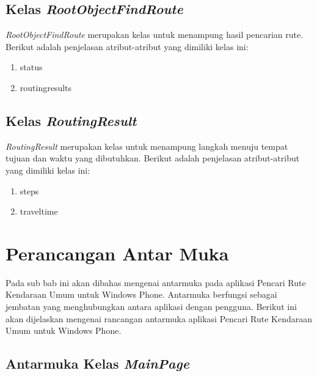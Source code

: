 \subsection{Kelas \textit{RootObjectFindRoute}}
\label{lab:Kelas RootObjectFindRoute}
\hspace{0.5cm} \textit{RootObjectFindRoute} merupakan kelas untuk menampung hasil pencarian rute. Berikut adalah penjelasan atribut-atribut yang dimiliki kelas ini:
\begin{enumerate}
	\item status
	\item routingresults
\end{enumerate}

\subsection{Kelas \textit{RoutingResult}}
\label{lab:Kelas RoutingResult}
\hspace{0.5cm} \textit{RoutingResult} merupakan kelas untuk menampung langkah menuju tempat tujuan dan waktu yang dibutuhkan. Berikut adalah penjelasan atribut-atribut yang dimiliki kelas ini:
\begin{enumerate}
	\item steps
	\item traveltime
\end{enumerate}


\section{Perancangan Antar Muka}
\label{lab:Perancangan Kelas}
\hspace{0.5cm} Pada sub bab ini akan dibahas mengenai antarmuka pada aplikasi Pencari Rute Kendaraan Umum untuk Windows Phone. Antarmuka berfungsi sebagai jembatan yang menghubungkan antara aplikasi dengan pengguna. Berikut ini akan dijelaskan mengenai rancangan antarmuka aplikasi Pencari Rute Kendaraan Umum untuk Windows Phone. 

\subsection{Antarmuka Kelas \textit{MainPage}}
\label{lab:Antarmuka Kelas MainPage}


